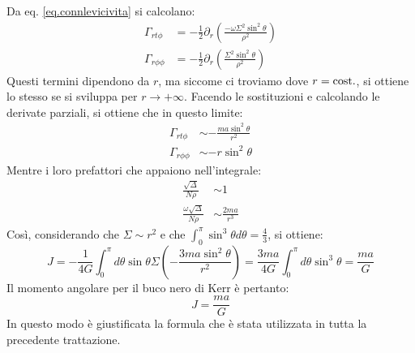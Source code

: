 Da eq. \ref{eq.connlevicivita} si calcolano:
\begin{align*}
    \Gamma_{rt\phi} &= - \frac{1}{2}\partial_r\left( \frac{-\omega\Sigma^2\sin^2\theta}{\rho^2}\right) \\
    \Gamma_{r\phi\phi} &= - \frac{1}{2}\partial_r\left( \frac{\Sigma^2\sin^2\theta}{\rho^2}\right)
\end{align*}
Questi termini dipendono da $r$, ma siccome ci troviamo dove $r=\textrm{cost.}$, si ottiene lo stesso se si sviluppa per $r\rightarrow +\infty$. Facendo le sostituzioni e calcolando le derivate parziali, si ottiene che in questo limite:
\begin{align*}
    \Gamma_{rt\phi} &\sim -\frac{ma\sin^2\theta}{r^2} \\
    \Gamma_{r\phi\phi} &\sim -r\sin^2\theta  
\end{align*}
Mentre i loro prefattori che appaiono nell'integrale:
\begin{align*}
    \frac{\sqrt{\Delta}}{N\rho} &\sim 1 \\
    \frac{\omega\sqrt{\Delta}}{N\rho} &\sim \frac{2ma}{r^3}
\end{align*}
Così, considerando che $\Sigma \sim r^2$ e che $\int_0^\pi \sin^3\theta d\theta = \frac{4}{3}$, si ottiene:
\begin{equation*}
    J = -\frac{1}{4G}\int_0^\pi d\theta \sin\theta\Sigma(-\frac{3ma\sin^2\theta}{r^2}) = \frac{3ma}{4G}\int_0^\pi d\theta \sin^3\theta = \frac{ma}{G}
\end{equation*}
Il momento angolare per il buco nero di Kerr è pertanto:
\begin{equation*}
    J = \frac{ma}{G}
\end{equation*}
In questo modo è giustificata la formula che è stata utilizzata in tutta la precedente trattazione.